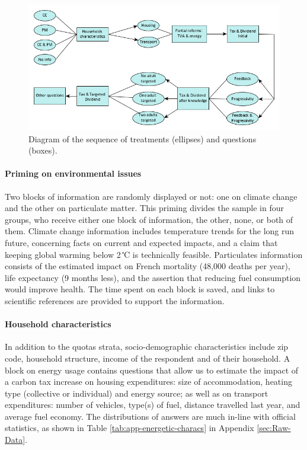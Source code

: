 \documentclass[12pt]{article} %
\begin{document}
\begin{figure}[H]
\centering
\includegraphics[width=1\columnwidth]{Images/diagram_survey_initial.png}
\caption{Diagram of the sequence of treatments (ellipses) and questions (boxes).}
\label{fig:survey}
\end{figure}

\paragraph{Priming on environmental issues}
Two blocks of information are randomly displayed or not: one on climate change and the other on particulate matter. This priming divides the sample in four groups, who receive either one block of information, the other, none, or both of them. Climate change information includes temperature trends for the long run future, concerning facts on current and expected impacts, and a claim that keeping global warming below 2\,℃ is technically feasible. Particulates information consists of the estimated impact on French mortality (48,000 deaths per year), life expectancy (9 months less), and the assertion that reducing fuel consumption would improve health. The time spent on each block is saved, and links to scientific references are provided to support the information.

\paragraph{Household characteristics}
In addition to the quotas strata, socio-demographic characteristics include zip code, household structure, income of the respondent and of their household. A block on energy usage contains questions that allow us to estimate the impact of a carbon tax increase on housing expenditures: size of accommodation, heating type (collective or individual) and energy source; as well as on transport expenditures: number of vehicles, type(s) of fuel, distance travelled last year, and average fuel economy. The distributions of answers are much in-line with official statistics, as shown in Table \ref{tab:app-energetic-characs} in Appendix \ref{sec:Raw-Data}.
\end{document}
